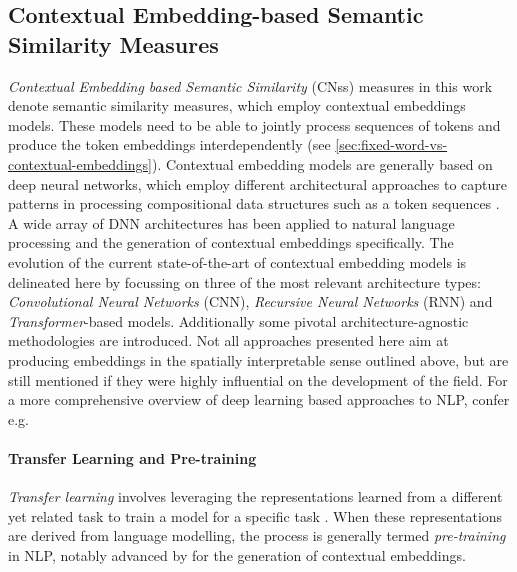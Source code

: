 \documentclass[11pt]{scrreprt}
\let\citef\cite  %
\let\cite\parencite  %
\begin{document}
\subsection{Contextual Embedding-based Semantic Similarity Measures}
\label{sec:contextual-embedding-semantic-similarity}
\textit{Contextual Embedding based Semantic Similarity} (CN\gls{ss}) measures in this work denote semantic similarity measures, which employ contextual embeddings models. These models need to be able to jointly process sequences of tokens and produce the token embeddings interdependently (see \cref{sec:fixed-word-vs-contextual-embeddings}). Contextual embedding models are generally based on deep neural networks, which employ different architectural approaches to capture patterns in processing compositional data structures such as a token sequences \cite{goodfellowDeepLearning2016}. A wide array of DNN architectures has been applied to natural language processing and the generation of contextual embeddings specifically. The evolution of the current state-of-the-art of contextual embedding models is delineated here by focussing on three of the most relevant architecture types: \textit{Convolutional Neural Networks} (CNN), \textit{Recursive Neural Networks} (RNN) and \textit{Transformer}-based models. Additionally some pivotal architecture-agnostic methodologies are introduced. Not all approaches presented here aim at producing embeddings in the spatially interpretable sense outlined above, but are still mentioned if they were highly influential on the development of the field. For a more comprehensive overview of deep learning based approaches to NLP, confer e.g. \citef{youngRecentTrendsDeep2018, minaeeDeepLearningBased2021, minRecentAdvancesNatural2023}

\paragraph{Transfer Learning and Pre-training} \textit{Transfer learning} involves leveraging the representations learned from a different yet related task to train a model for a specific task \cite{zhuangComprehensiveSurveyTransfer2021}. When these representations are derived from language modelling, the process is generally termed \textit{pre-training} in NLP, notably advanced by \citef{daiSemisupervisedSequenceLearning2015} for the generation of contextual embeddings.
\end{document}
